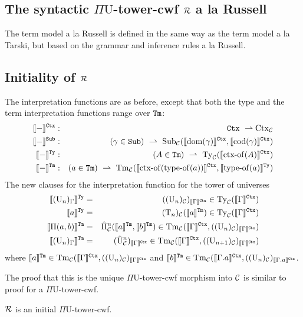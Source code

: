 \documentclass{lmcs}
\def\UU{\mathrm{U}}
\def\Ta{\mathrm{T}}
\def\Pihat{\hat{\Pi}}
\def\UUhat{\hat{\UU}}
\newcommand{\intCtxU}[1]{\llbracket #1 \rrbracket^\RawCtx}
\newcommand{\intSubU}[1]{\llbracket #1 \rrbracket^\RawSub}
\newcommand{\intTyU}[1]{\llbracket #1 \rrbracket^\RawTy}
\newcommand{\intTmU}[1]{\llbracket #1 \rrbracket^\RawTm}
\begin{document}
\subsection{The syntactic $\Pi\UU$-tower-cwf $\mathcal{R}$ a la Russell}
The term model a la Russell is defined in the same way as the term model a la Tarski, but based on the grammar and inference rules a la Russell.

\subsection{Initiality of $\mathcal{R}$}
The interpretation functions are as before, except that both the type and the term interpretation functions range over ${\tt Tm}$:
\begin{eqnarray*}
\intCtxU{-} &:& \RawCtx\ \rightharpoonup \Ctx_\C\\
\intSubU{-}&:& (\gamma \in \RawSub)\ \rightharpoonup \
\Sub_\C(\intCtxU{\domain(\gamma)}, \intCtxU{\codomain(\gamma)})\\
\intTyU{-}&:& (A \in \RawTm)\ \rightharpoonup\ \Ty_\C(\intCtxU{\ctxof(A)})\\
\intTmU{-}&:& (a \in\RawTm)\ \rightharpoonup\
\Tm_\C (\intCtxU{\ctxof(\typeof(a))}, \intTyU{\typeof(a)})
\end{eqnarray*}
The new clauses for the interpretation function for the tower of universes
\begin{eqnarray*}
\intTyU{(\UU_n)_\Gamma} &=& ((\UU_n)_\C)_{\intCtxU{\Gamma}} \in \Ty_\C(\intCtxU{\Gamma})\\
\intTyU{a} &=& (\Ta_n)_\C(\intTmU{a}) \in \Ty_\C(\intCtxU{\Gamma})\\
\intTmU{\Pi(a,b)}&=& \Pihat^n_\C(\intTmU{a},\intTmU{b}) \in \Tm_\C(\intCtxU{\Gamma},((\UU_n)_\C)_{\intCtxU{\Gamma}})\\
\intTmU{(\UU_n)_\Gamma} &=& (\UUhat^n_\C)_{\intCtxU{\Gamma}} \in \Tm_\C(\intCtxU{\Gamma},((\UU_{n+1})_\C)_{\intCtxU{\Gamma}})
\end{eqnarray*}
where 
$\intTmU{a} \in \Tm_\C(\intCtxU{\Gamma},((\UU_n)_\C)_{\intCtxU{\Gamma}}$ and 
$\intTmU{b} \in \Tm_\C(\intCtxU{\Gamma.a},((\UU_n)_\C)_{\intCtxU{\Gamma.a}}$.

The proof that this is the unique $\Pi\UU$-tower-cwf morphism into ${\mathcal C}$ is similar to proof for a $\Pi\UU$-tower-cwf. 


\begin{thm}\label{theom:initial_cwf}
  $\mathcal{R}$ is an initial $\Pi\UU$-tower-cwf.
\end{thm}




\end{document}
